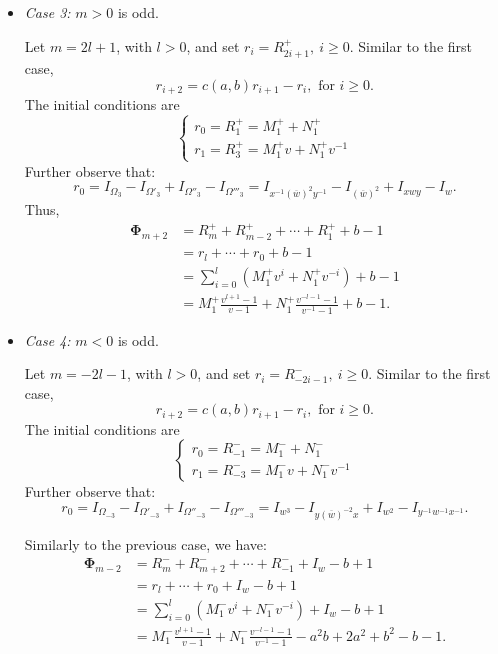 \documentclass[a4paper]{amsart}
\theoremstyle{plain}
\theoremstyle{definition}
\theoremstyle{remark}
\begin{document}
\begin{itemize}
  \item {\it Case 3:} $m > 0$ is odd. 

Let $m=2l+1$, with $l>0$, and set $r_i=R^+_{2i+1},\ i\geqslant 0$. Similar to the first case, 
$$r_{i+2}=c(a,b)r_{i+1}-r_i, \text{ for } i\geqslant 0.$$ 
The initial conditions are
\[
\begin{cases}
      r_0=R^+_1=M^+_1+N^+_1  \\
      r_1=R^+_3=M^+_1v+N^+_1v^{-1}
\end{cases}
\] 
Further observe that:
\[
r_0 = I_{\Omega_3} - I_{\Omega'_3} + I_{\Omega''_3}- I_{\Omega'''_3} = I_{x^{-1}(\overline{w})^{2}y^{-1}} - I_{(\overline{w})^{2}} + I_{xwy} - I_w.
\]
Thus, 
\begin{equation*}\begin{split}{\mathbf\Phi}_{m+2}&=R^+_m+R^+_{m-2}+\dotsb+R^+_1+b-1\\ 
&= r_l + \dotsb + r_0 + b - 1\\
&=\sum_{i=0}^l (M^+_1v^i+N^+_1v^{-i})+b-1\\
&=M^+_1\frac{v^{l+1}-1}{v-1}+N^+_1\frac{v^{-l-1}-1}{v^{-1}-1}+b-1.
\end{split}\end{equation*}

\item {\it Case 4:} $m < 0$ is odd. 

Let $m=-2l-1$, with $l>0$, and set $r_i=R^-_{-2i-1},\ i\geqslant 0$. Similar to the first case, 
$$r_{i+2}=c(a,b)r_{i+1}-r_i, \text{ for } i\geqslant 0.$$ 
The initial conditions are
\[
\begin{cases}
      r_0=R^-_{-1}=M^-_1+N^-_1  \\
      r_1=R^-_{-3}=M^-_1v+N^-_1v^{-1}
\end{cases}
\] 
Further observe that:
\[
r_0 = I_{\Omega_{-3}} - I_{\Omega'_{-3}} + I_{\Omega''_{-3}} - I_{\Omega'''_{-3}} = I_{w^3} - I_{y(\overline{w})^{-2}x} + I_{w^2} - I_{y^{-1}w^{-1}x^{-1}}.
\]


Similarly to the previous case, we have:
\begin{equation*}\begin{split}{\mathbf\Phi}_{m-2}&=R^-_m+R^-_{m+2}+\dotsb +R^-_{-1} + I_{w} - b + 1\\ 
&= r_l + \dotsb + r_0 +I_{w} - b + 1\\
&=\sum_{i=0}^l (M^-_1v^i+N^-_1v^{-i}) +I_{w} - b + 1\\
&=M^-_1\frac{v^{l+1}-1}{v-1}+N^-_1\frac{v^{-l-1}-1}{v^{-1}-1} - a^2b + 2a^2 + b^2 - b - 1.
\end{split}\end{equation*}
\end{itemize}
\end{document}
